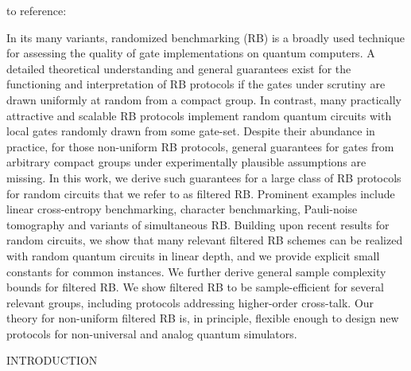 to reference: \cite{heinrichRandomizedBenchmarkingRandom_2023}

In its many variants, randomized benchmarking (RB) is a broadly used technique for assessing the quality of gate implementations on quantum computers. A detailed theoretical understanding and general guarantees exist for the functioning and interpretation of RB protocols if the gates under scrutiny are drawn uniformly at random from a compact group. In contrast, many practically attractive and scalable RB protocols implement random quantum circuits with local gates randomly drawn from some gate-set. Despite their abundance in practice, for those non-uniform RB protocols, general guarantees for gates from arbitrary compact groups under experimentally plausible assumptions are missing. In this work, we derive such guarantees for a large class of RB protocols for random circuits that we refer to as filtered RB. Prominent examples include linear cross-entropy benchmarking, character benchmarking, Pauli-noise tomography and variants of simultaneous RB. Building upon recent results for random circuits, we show that many relevant filtered RB schemes can be realized with random quantum circuits in linear depth, and we provide explicit small constants for common instances. We further derive general sample complexity bounds for filtered RB. We show filtered RB to be sample-efficient for several relevant groups, including protocols addressing higher-order cross-talk. Our theory for non-uniform filtered RB is, in principle, flexible enough to design new protocols for non-universal and analog quantum simulators.

INTRODUCTION 

